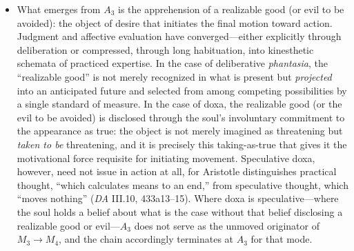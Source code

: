 \begin{itemize}
\begin{itemize}

          \item What emerges from $A_3$ is the apprehension of a realizable good (or
          evil to be avoided): the object of desire that initiates the final motion
          toward action. Judgment and affective evaluation have converged---either
          explicitly through deliberation or compressed, through long habituation,
          into kinesthetic schemata of practiced expertise. In the case of
          deliberative \textit{phantasia}, the ``realizable good'' is not merely
          recognized in what is present but \textit{projected} into an anticipated
          future and selected from among competing possibilities by a single standard
          of measure. In the case of doxa, the realizable good (or the evil to be
          avoided) is disclosed through the soul's involuntary commitment to the
          appearance as true: the object is not merely imagined as threatening but
          \textit{taken to be} threatening, and it is precisely this taking-as-true
          that gives it the motivational force requisite for initiating movement.
          Speculative doxa, however, need not issue in action at all, for Aristotle
          distinguishes practical thought, ``which calculates means to an end,'' from
          speculative thought, which ``moves nothing'' (\textit{DA} III.10,
          433a13--15). Where doxa is speculative---where the soul holds a belief about
          what is the case without that belief disclosing a realizable good or
          evil---$A_3$ does not serve as the unmoved originator of
          $M_3 \rightarrow M_4$, and the chain accordingly terminates at $A_3$ for
          that mode.


\end{itemize}
\end{itemize}
